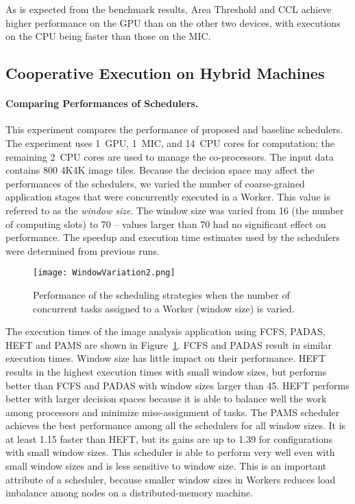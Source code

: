 As is expected from the benchmark results, Area Threshold and CCL achieve higher 
performance on the GPU than on the other two devices, with executions on the CPU 
being faster than those on the MIC. 
\subsection{Cooperative Execution on Hybrid Machines}
\paragraph{{\bf Comparing Performances of Schedulers.}}
This experiment compares the performance of proposed and baseline schedulers.
The experiment uses 1~GPU, 1~MIC, and 14~CPU cores for
computation; the remaining 2~CPU cores are used to manage the co-processors. The
input data contains 800 4K4K image tiles. Because the decision space
may affect the performances of the schedulers, we varied the number of
coarse-grained application stages that were concurrently executed in a Worker. This value 
is referred to as the {\em window size}. The window size was varied from 16 (the number of
computing slots) to 70 -- values larger than 70 had no significant effect 
on performance. The
speedup and execution time estimates used by the schedulers were determined from 
previous runs. 
\begin{figure}[h!]
	\centering
	\texttt{[image: WindowVariation2.png]}
\vspace{-2mm}
	\caption{Performance of the scheduling strategies when the number of 
	concurrent tasks assigned to a Worker (window size) is varied.}
	\label{fig:windowVariation}
\end{figure}

The execution times of the image analysis application using FCFS, PADAS, HEFT and 
PAMS are shown in Figure~\ref{fig:windowVariation}. FCFS and PADAS result in similar
execution times. Window size has little impact on their
performance. HEFT results in the highest execution times with
small window sizes, but performs better than 
FCFS and PADAS with window sizes larger than 45. HEFT performs better with larger
decision spaces because it is able to balance well the work among processors and
minimize miss-assignment of tasks.
The PAMS scheduler achieves the best performance among all the schedulers 
for all window sizes. It is at least 1.15 faster
than HEFT, but its gains are up to 1.39 for configurations with small
window sizes. This scheduler is able to perform very well even with small
window sizes and is less sensitive to window size. This is an important attribute
of a scheduler, because smaller window sizes in Workers 
reduces load imbalance among nodes on a distributed-memory machine.

